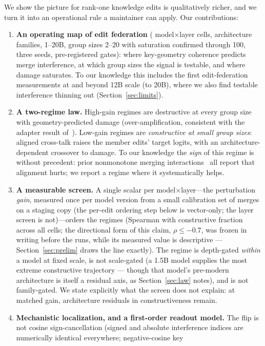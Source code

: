 \documentclass[preprint,12pt]{elsarticle}
\theoremstyle{definition}
\begin{document}
We show the picture for rank-one knowledge edits is qualitatively richer, and we turn it
into an operational rule a maintainer can apply. Our contributions:
\begin{enumerate}
\item \textbf{An operating map of edit federation} (\nCells{} model$\times$layer cells,
\nFamilies{} architecture families, 1--20B, group sizes 2--20 with saturation confirmed
through 100, three seeds, pre-registered gates): where key-geometry coherence predicts merge interference, at which group sizes the
signal is testable, and where damage saturates. To our knowledge this includes the first
edit-federation measurements at and beyond 12B scale (to 20B), where we also find
testable interference thinning out (Section~\ref{sec:limits}).
\item \textbf{A two-regime law.} High-gain regimes are destructive at every group size with
geometry-predicted damage (over-amplification, consistent with the adapter result
of~\cite{mergeprobe2026}). Low-gain regimes are \emph{constructive at small group sizes}:
aligned cross-talk raises the member edits' target logits, with an architecture-dependent
crossover to damage. To our knowledge the \emph{sign} of this regime is without precedent:
prior nonmonotone merging interactions~\cite{forkmerge2023,mergeprobe2026} all report that
alignment hurts; we report a regime where it systematically helps.
\item \textbf{A measurable screen.} A single scalar per model$\times$layer---the
perturbation \emph{gain}, measured once per model version from a small calibration set
of merges on a staging copy (the per-edit ordering step below is vector-only; the layer
screen is not)---orders
the regimes (Spearman \ordSpearman{} with constructive fraction across all cells; the
directional form of this claim, $\rho\leq-0.7$, was frozen in writing before the runs,
while its measured value is descriptive --- Section~\ref{sec:prelim} draws the line
exactly). The
regime is depth-gated \emph{within} a model at fixed scale, is not scale-gated (a 1.5B model
supplies the most extreme constructive trajectory --- though that model's pre-modern
architecture is itself a residual axis, as Section~\ref{sec:law} notes), and is not
family-gated. We state explicitly
what the screen does not explain: at matched gain, architecture residuals in
constructiveness remain.
\item \textbf{Mechanistic localization, and a first-order readout model.} The flip is not
cosine sign-cancellation (signed
and absolute interference indices are numerically identical everywhere; negative-cosine key

\end{enumerate}
\end{document}
